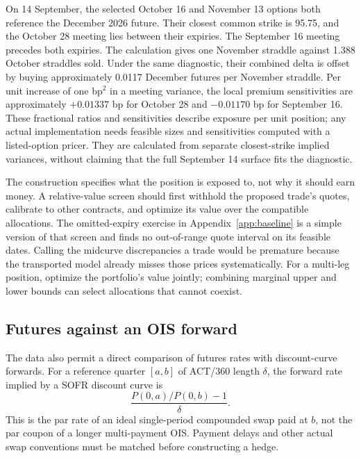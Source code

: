 On 14 September, the selected October 16 and November 13 options both reference the December 2026 future. Their closest common strike is 95.75, and the October 28 meeting lies between their expiries. The September 16 meeting precedes both expiries. The calculation gives one November straddle against 1.388 October straddles sold. Under the same diagnostic, their combined delta is offset by buying approximately 0.0117 December futures per November straddle. Per unit increase of one bp$^2$ in a meeting variance, the local premium sensitivities are approximately $+0.01337$ bp for October 28 and $-0.01170$ bp for September 16. These fractional ratios and sensitivities describe exposure per unit position; any actual implementation needs feasible sizes and sensitivities computed with a listed-option pricer. They are calculated from separate closest-strike implied variances, without claiming that the full September 14 surface fits the diagnostic.

The construction specifies what the position is exposed to, not why it should earn money. A relative-value screen should first withhold the proposed trade's quotes, calibrate to other contracts, and optimize its value over the compatible allocations. The omitted-expiry exercise in Appendix~\ref{app:baseline} is a simple version of that screen and finds no out-of-range quote interval on its feasible dates. Calling the midcurve discrepancies a trade would be premature because the transported model already misses those prices systematically. For a multi-leg position, optimize the portfolio's value jointly; combining marginal upper and lower bounds can select allocations that cannot coexist.

\subsection{Futures against an OIS forward}
The data also permit a direct comparison of futures rates with discount-curve forwards. For a reference quarter $[a,b]$ of ACT/360 length $\delta$, the forward rate implied by a SOFR discount curve is
\begin{equation}\label{eq:oisforward}
\frac{P(0,a)/P(0,b)-1}{\delta}.
\end{equation}
This is the par rate of an ideal single-period compounded swap paid at $b$, not the par coupon of a longer multi-payment OIS. Payment delays and other actual swap conventions must be matched before constructing a hedge.

